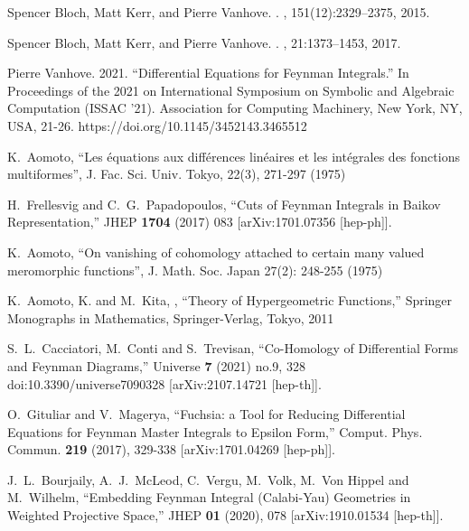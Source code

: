 \documentclass[a4paper,12pt]{article}
\numberwithin{equation}{section}
\numberwithin{figure}{subsection}
\theoremstyle{plain}
\theoremstyle{plain}
\theoremstyle{definition}
\theoremstyle{plain}
\theoremstyle{remark}
\theoremstyle{plain}
\begin{document}
\begin{thebibliography}{99}
Spencer Bloch, Matt Kerr, and Pierre Vanhove.
.
, 151(12):2329--2375, 2015.
\newblock [arXiv:1406.2664] 

Spencer Bloch, Matt Kerr, and Pierre Vanhove.
.
, 21:1373--1453, 2017.
\newblock [arXiv:1601.08181]
  
  Pierre Vanhove. 2021. ``Differential Equations for Feynman Integrals.'' In Proceedings of the 2021 on International Symposium on Symbolic and Algebraic Computation (ISSAC '21). Association for Computing Machinery, New York, NY, USA, 21-26. https://doi.org/10.1145/3452143.3465512

    K.~Aomoto, ``Les \'equations aux diff\'erences
     lin\'eaires et les int\'egrales des fonctions multiformes'',
     J. Fac. Sci. Univ. Tokyo, 22(3), 271-297  (1975)
  
  H.~Frellesvig and C.~G.~Papadopoulos,
  ``Cuts of Feynman Integrals in Baikov Representation,''
  JHEP {\bf 1704} (2017) 083
  [arXiv:1701.07356 [hep-ph]].

   K.~Aomoto, ``On vanishing of cohomology attached to
    certain many valued meromorphic functions'', J. Math. Soc. Japan
    27(2): 248-255 (1975)

     K.~Aomoto, K. and M.~Kita, , ``Theory of Hypergeometric Functions,'' Springer Monographs in Mathematics, Springer-Verlag, Tokyo, 2011
    
S.~L.~Cacciatori, M.~Conti and S.~Trevisan,
``Co-Homology of Differential Forms and Feynman Diagrams,''
Universe \textbf{7} (2021) no.9, 328
doi:10.3390/universe7090328
[arXiv:2107.14721 [hep-th]].
  
O.~Gituliar and V.~Magerya,
``Fuchsia: a Tool for Reducing Differential Equations for Feynman Master Integrals to Epsilon Form,''
Comput. Phys. Commun. \textbf{219} (2017), 329-338
[arXiv:1701.04269 [hep-ph]].

J.~L.~Bourjaily, A.~J.~McLeod, C.~Vergu, M.~Volk, M.~Von Hippel and M.~Wilhelm,
``Embedding Feynman Integral (Calabi-Yau) Geometries in Weighted Projective Space,''
JHEP \textbf{01} (2020), 078
[arXiv:1910.01534 [hep-th]].


\end{thebibliography}
\end{document}
